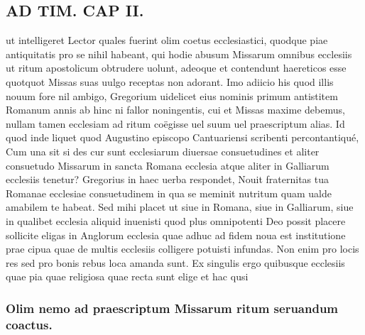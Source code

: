 \documentclass{article}
\begin{document}
\begin{pages}
\section*{AD TIM. CAP II. }
\marginpar{[ p.110 ]}\pstart ut intelligeret Lector quales fuerint olim coetus ecclesiastici, quodque piae antiquitatis pro se nihil habeant, qui hodie abusum Missarum omnibus ecclesiis ut ritum apostolicum obtrudere uolunt, adeoque et contendunt haereticos esse quotquot Missas suas uulgo receptas non adorant. Imo adiicio his quod illis nouum fore nil ambigo, Gregorium uidelicet eius nominis primum antistitem Romanum annis ab hinc ni fallor noningentis, cui et Missas maxime debemus, nullam tamen ecclesiam ad ritum coëgisse uel suum uel praescriptum alias. Id quod inde liquet quod Augustino episcopo Cantuariensi scribenti percontantiqué, Cum una sit si des cur sunt ecclesiarum diuersae consuetudines et aliter consuetudo Missarum in sancta Romana ecclesia atque aliter in Galliarum ecclesiis tenetur? Gregorius in haec uerba respondet, Nouit fraternitas tua Romanae ecclesiae consuetudinem in qua se meminit nutritum quam ualde amabilem te habeat. Sed mihi placet ut siue in Romana, siue in Galliarum, siue in qualibet ecclesia aliquid inuenisti quod plus omnipotenti Deo possit placere sollicite eligas in Anglorum ecclesia quae adhuc ad fidem noua est institutione prae cipua quae de multis ecclesiis colligere potuisti infundas. Non enim pro locis res sed pro bonis rebus loca amanda sunt. Ex singulis ergo quibusque ecclesiis quae pia quae religiosa quae recta sunt elige et hac qusi  \pend
\subsubsection*{Olim nemo ad praescriptum Missarum ritum seruandum coactus. }

\end{pages}
\end{document}
